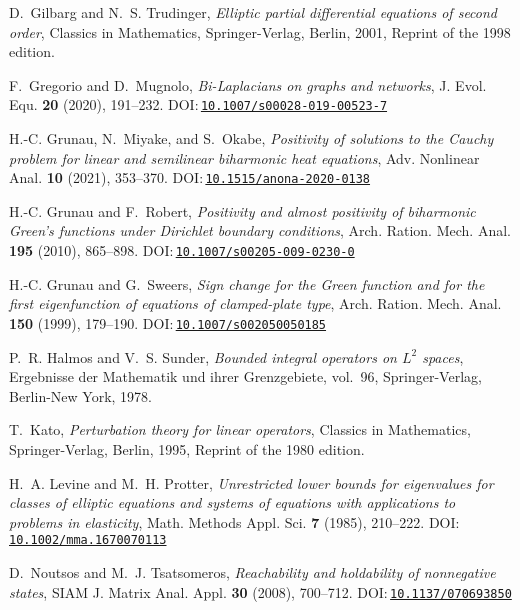 \documentclass[a4paper, reqno]{amsart}
\numberwithin{equation}{section}
\theoremstyle{plain}
\theoremstyle{definition}
\theoremstyle{remark}
\begin{document}
\begin{thebibliography}{10}
D.~Gilbarg and N.~S. Trudinger, \emph{Elliptic partial differential equations
  of second order}, Classics in Mathematics, Springer-Verlag, Berlin, 2001,
  Reprint of the 1998 edition.

F.~Gregorio and D.~Mugnolo, \emph{Bi-{L}aplacians on graphs and networks}, J.
  Evol. Equ. \textbf{20} (2020), 191--232.
  DOI:\,\href{https://doi.org/10.1007/s00028-019-00523-7}{\nolinkurl{10.1007/s00028-019-00523-7}}

H.-C. Grunau, N.~Miyake, and S.~Okabe, \emph{Positivity of solutions to the
  {C}auchy problem for linear and semilinear biharmonic heat equations}, Adv.
  Nonlinear Anal. \textbf{10} (2021), 353--370.
  DOI:\,\href{https://doi.org/10.1515/anona-2020-0138}{\nolinkurl{10.1515/anona-2020-0138}}

H.-C. Grunau and F.~Robert, \emph{Positivity and almost positivity of
  biharmonic {G}reen's functions under {D}irichlet boundary conditions}, Arch.
  Ration. Mech. Anal. \textbf{195} (2010), 865--898.
  DOI:\,\href{https://doi.org/10.1007/s00205-009-0230-0}{\nolinkurl{10.1007/s00205-009-0230-0}}

H.-C. Grunau and G.~Sweers, \emph{Sign change for the {G}reen function and for
  the first eigenfunction of equations of clamped-plate type}, Arch. Ration.
  Mech. Anal. \textbf{150} (1999), 179--190.
  DOI:\,\href{https://doi.org/10.1007/s002050050185}{\nolinkurl{10.1007/s002050050185}}

P.~R. Halmos and V.~S. Sunder, \emph{Bounded integral operators on {$L^{2}$}
  spaces}, Ergebnisse der Mathematik und ihrer Grenzgebiete, vol.~96,
  Springer-Verlag, Berlin-New York, 1978.

T.~Kato, \emph{Perturbation theory for linear operators}, Classics in
  Mathematics, Springer-Verlag, Berlin, 1995, Reprint of the 1980 edition.

H.~A. Levine and M.~H. Protter, \emph{Unrestricted lower bounds for eigenvalues
  for classes of elliptic equations and systems of equations with applications
  to problems in elasticity}, Math. Methods Appl. Sci. \textbf{7} (1985),
  210--222.
  DOI:\,\href{https://doi.org/10.1002/mma.1670070113}{\nolinkurl{10.1002/mma.1670070113}}

D.~Noutsos and M.~J. Tsatsomeros, \emph{Reachability and holdability of
  nonnegative states}, SIAM J. Matrix Anal. Appl. \textbf{30} (2008), 700--712.
  DOI:\,\href{https://doi.org/10.1137/070693850}{\nolinkurl{10.1137/070693850}}


\end{thebibliography}
\end{document}
